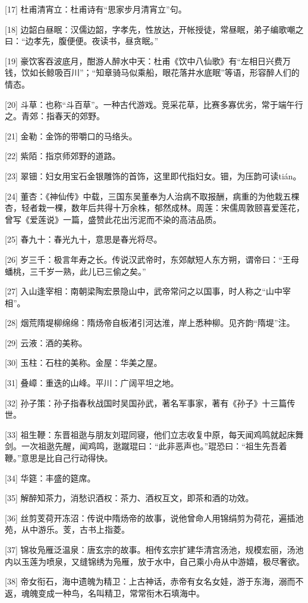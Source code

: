 \documentclass[12pt,UTF8]{ctexbook}
\begin{document}
[17] 杜甫清宵立：杜甫诗有“思家步月清宵立”句。

[18] 边韶白昼眠：汉儒边韶，字孝先，性放达，开帐授徒，常昼眠，弟子编歌嘲之曰：“边孝先，腹便便。夜读书，昼贪眠。”

[19] 豪饮客吞波底月，酣游人醉水中天：杜甫《饮中八仙歌》有“左相日兴费万钱，饮如长鲸吸百川”；“知章骑马似乘船，眼花落井水底眠”等语，形容醉人们的情态。

[20] 斗草：也称“斗百草”。一种古代游戏。竞采花草，比赛多寡优劣，常于端午行之。青郊：指春天的郊野。

[21] 金勒：金饰的带嚼口的马络头。

[22] 紫陌：指京师郊野的道路。

[23] 翠钿：妇女用宝石金银雕饰的首饰，这里即代指妇女。钿，为压韵可读tián。

[24] 董杏：《神仙传》中载，三国东吴董奉为人治病不取报酬，病重的为他栽五棵杏，轻者栽一棵，数年后共得十万余株，郁然成林。周莲：宋儒周敦颐喜爱莲花，曾写《爱莲说》一篇，盛赞此花出污泥而不染的高洁品质。

[25] 春九十：春光九十，意思是春光将尽。

[26] 岁三千：极言年寿之长。传说汉武帝时，东郊献短人东方朔，谓帝曰：“王母蟠桃，三千岁一熟，此儿已三偷之矣。”

[27] 入山逢宰相：南朝梁陶宏景隐山中，武帝常问之以国事，时人称之“山中宰相”。

[28] 烟荒隋堤柳绵绵：隋炀帝自板渚引河达淮，岸上悉种柳。见齐韵“隋堤”注。

[29] 云液：酒的美称。

[30] 玉柱：石柱的美称。金屋：华美之屋。

[31] 叠嶂：重迭的山峰。平川：广阔平坦之地。

[32] 孙子策：孙子指春秋战国时吴国孙武，著名军事家，著有《孙子》十三篇传世。

[33] 祖生鞭：东晋祖逖与朋友刘琨同寝，他们立志收复中原，每天闻鸡鸣就起床舞剑。一次祖逖先醒，闻鸡鸣，逖蹴琨曰：“此非恶声也。”琨恐曰：“祖生先吾着鞭。”意思是比自己行动得快。

[34] 华筵：丰盛的筵席。

[35] 解醉知茶力，消愁识酒权：茶力、酒权互文，即茶和酒的功效。

[36] 丝剪芰荷开冻沼：传说中隋炀帝的故事，说他曾命人用锦绢剪为荷花，遍插池苑，从中游乐。芰，古书上指菱。

[37] 锦妆凫雁泛温泉：唐玄宗的故事。相传玄宗扩建华清宫汤池，规模宏丽，汤池内以玉莲为喷泉，又缝锦绣为凫雁，放于水中，自己乘小舟从中游嬉，极尽奢欲。

[38] 帝女衔石，海中遗魄为精卫：上古神话，赤帝有女名女娃，游于东海，溺而不返，魂魄变成一种鸟，名叫精卫，常常衔木石填海中。
\end{document}
